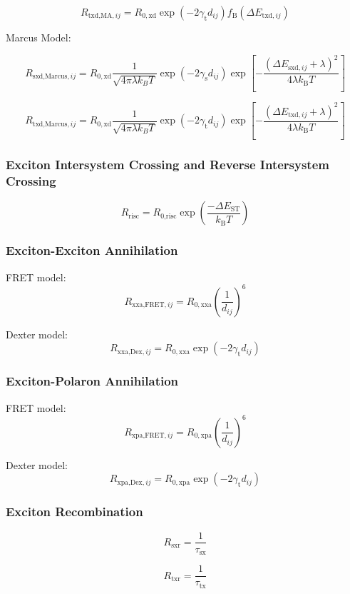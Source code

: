 \documentclass[%
 reprint,onecolumn,notitlepage,
superscriptaddress,longbibliography,
 amsmath,amssymb,
 aps,rmp,floatfix,
]{revtex4-1}
\begin{document}
$$R_{\text{txd,MA},ij} = R_{0,\text{xd}} \exp{\left(- 2 \gamma_{\text{t}} d_{ij} \right)} f_\text{B} \left( \Delta E_{\text{txd},ij}\right)$$

Marcus Model:

$$R_{\text{sxd,Marcus},ij} = R_{0,\text{xd}} \frac{1}{\sqrt{4\pi\lambda k_B T}}\exp{\left(- 2 \gamma_{\text{s}} d_{ij} \right)} \exp{\left[-\frac{(\Delta E_{\text{sxd},ij}+\lambda)^2}{4\lambda k_\text{B} T} \right]}$$

$$R_{\text{txd,Marcus},ij} = R_{0,\text{xd}} \frac{1}{\sqrt{4\pi\lambda k_B T}}\exp{\left(- 2 \gamma_{\text{t}} d_{ij} \right)} \exp{\left[-\frac{(\Delta E_{\text{txd},ij}+\lambda)^2}{4\lambda k_\text{B} T} \right]}$$

\subsubsection{Exciton Intersystem Crossing and Reverse Intersystem Crossing}

$$R_\text{risc} = R_\text{0,risc} \exp\left(\frac{-\Delta E_\text{ST}}{k_\text{B}T}\right)$$

\subsubsection{Exciton-Exciton Annihilation}

FRET model:
$$R_{\text{xxa,FRET},ij} = R_{0,\text{xxa}} \left( \frac{1}{d_{ij}} \right)^6$$

Dexter model:
$$R_{\text{xxa,Dex},ij} = R_{0,\text{xxa}} \exp{\left(- 2 \gamma_{\text{t}} d_{ij} \right)}$$

\subsubsection{Exciton-Polaron Annihilation}

FRET model:
$$R_{\text{xpa,FRET},ij} = R_{0,\text{xpa}} \left( \frac{1}{d_{ij}} \right)^6$$

Dexter model:
$$R_{\text{xpa,Dex},ij} = R_{0,\text{xpa}} \exp{\left(- 2 \gamma_{\text{t}} d_{ij} \right)}$$

\subsubsection{Exciton Recombination}

$$R_\text{sxr} = \frac{1}{\tau_\text{sx}}$$

$$R_\text{txr} = \frac{1}{\tau_\text{tx}}$$
\end{document}
